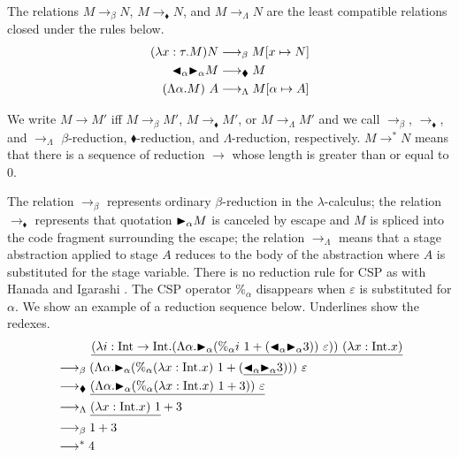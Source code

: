 \begin{definition}[Reduction]
    The relations $M \longrightarrow_\beta N$, $M \longrightarrow_\blacklozenge N$, and $M \longrightarrow_\Lambda N$
    are the least compatible relations closed under the rules below.
{%
    \begin{align*}
         (\lambda x:\tau.M) N & \longrightarrow_\beta M[x \mapsto N]         \\
         {\mathop{\blacktriangleleft}}_\alpha {\mathop{\blacktriangleright}}_\alpha M & \longrightarrow_\blacklozenge M          \\
         (\Lambda \alpha.M)\ A & \longrightarrow_\Lambda M[\alpha \mapsto A]
    \end{align*}
  }    
\end{definition}
We write $ M \longrightarrow M'$ iff $ M \longrightarrow_\beta M'$,
$ M \longrightarrow_\blacklozenge M'$, or
$ M \longrightarrow_\Lambda M'$ and we call $\longrightarrow_\beta$,
$\longrightarrow_\blacklozenge$, and $\longrightarrow_\Lambda$
$\beta$-reduction, $\blacklozenge$-reduction, and $\Lambda$-reduction,
respectively.
$M \longrightarrow^* N$ means that there is a sequence of reduction $\longrightarrow$ whose length is greater than or equal to 0.

The relation $\longrightarrow_\beta$ represents ordinary $\beta$-reduction in the \(\lambda\)-calculus; the relation
$\longrightarrow_\blacklozenge$ represents that quotation ${\mathop{\blacktriangleright}}_\alpha M$ is canceled by escape and $M$ is spliced into the code fragment surrounding the escape;
the relation $\longrightarrow_\Lambda$ means that a stage abstraction applied to  stage $A$ reduces to the body of the abstraction
where $A$ is substituted for the stage variable.
There is no reduction rule for CSP as with Hanada and Igarashi \cite{Hanada2014}.
The CSP operator $\%_\alpha$ disappears when $\varepsilon$ is substituted for $\alpha$.
We show an example of a reduction sequence below.
Underlines show the redexes.
\begin{align*}
     & \hspace{10mm} \underline{(\lambda i:\I\to\I.(\Lambda\alpha.\TB_\alpha (\%_\alpha i\ 1 + (\TBL_\alpha \TB_\alpha 3))\ \varepsilon))\ (\lambda x:\I.x)} \\
     & \longrightarrow_\beta (\Lambda\alpha.\TB_\alpha (\%_\alpha (\lambda x:\I.x)\ 1 + (\underline{\TBL_\alpha \TB_\alpha 3})))\ \varepsilon        \\
     & \longrightarrow_\blacklozenge \underline{(\Lambda\alpha.\TB_\alpha (\%_\alpha (\lambda x:\I.x)\ 1 + 3))\ \varepsilon}                                         \\
     & \longrightarrow_\Lambda \underline{(\lambda x:\I.x)\ 1} + 3                                                                                           \\
     & \longrightarrow_\beta 1 + 3                                                                                                                           \\
     & \longrightarrow^* 4
\end{align*}

